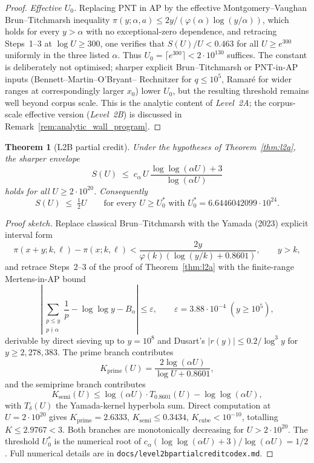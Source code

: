 \documentclass[11pt]{article}
\renewcommand{\_}{\origunderscore\allowbreak}
\newtheorem{theorem}{Theorem}[section]
\theoremstyle{definition}
\theoremstyle{remark}
\begin{document}
\begin{proof}
\emph{Effective $U_{0}$.}  Replacing PNT in AP by the effective
Montgomery--Vaughan Brun--Titchmarsh inequality
$\pi(y;\alpha,a)\le 2y/(\varphi(\alpha)\log(y/\alpha))$, which holds
for every $y>\alpha$ with no exceptional-zero dependence, and
retracing Steps~1--3 at $\log U\ge 300$, one verifies that
$S(U)/U<0.463$ for all $U\ge e^{300}$ uniformly in the three listed
$\alpha$.  Thus $U_{0}=\lceil e^{300}\rceil<2\cdot 10^{130}$ suffices.
The constant is deliberately not optimised; sharper explicit
Brun--Titchmarsh or PNT-in-AP inputs (Bennett--Martin--O'Bryant--
Rechnitzer for $q\le 10^{5}$, Ramar\'e for wider ranges at
correspondingly larger $x_{0}$) lower $U_{0}$, but the resulting
threshold remains well beyond corpus scale.  This is the analytic
content of \emph{Level~2A}; the corpus-scale effective version
(\emph{Level~2B}) is discussed in Remark~\ref{rem:analytic_wall_program}.
\end{proof}

\begin{theorem}[L2B partial credit]\label{thm:l2b_partial}
Under the hypotheses of Theorem~\ref{thm:l2a}, the sharper envelope
\[
  S(U)\;\le\;c_{\alpha}\,U\,\frac{\log\log(\alpha U)+3}{\log(\alpha U)}
\]
holds for all $U\ge 2\cdot 10^{20}$.  Consequently
\[
  S(U)\;\le\;\tfrac{1}{2}U\qquad\text{for every }U\ge U_{0}^{\ast}
  \text{ with }
  U_{0}^{\ast}=6.6446042099\cdot 10^{24}.
\]
\end{theorem}

\begin{proof}[Proof sketch]
Replace classical Brun--Titchmarsh with the Yamada (2023) explicit
interval form
\[
  \pi(x+y;k,\ell)-\pi(x;k,\ell)
  <\frac{2y}{\varphi(k)(\log(y/k)+0.8601)},
  \qquad y>k,
\]
and retrace Steps~2--3 of the proof of Theorem~\ref{thm:l2a} with the
finite-range Mertens-in-AP bound
\[
  \left|\sum_{\substack{p\le y\\p\nmid\alpha}}\frac{1}{p}
    -\log\log y-B_{\alpha}\right|\le \varepsilon,\qquad
  \varepsilon=3.88\cdot 10^{-4}\;(y\ge 10^{5}),
\]
derivable by direct sieving up to $y=10^{8}$ and Dusart's
$|r(y)|\le 0.2/\log^{3}y$ for $y\ge 2{,}278{,}383$.  The prime
branch contributes
\[
  K_{\mathrm{prime}}(U)=\frac{2\log(\alpha U)}{\log U+0.8601},
\]
and the semiprime branch contributes
\[
  K_{\mathrm{semi}}(U)\le\log(\alpha U)\cdot T_{0.8601}(U)-\log\log(\alpha U),
\]
with $T_{\delta}(U)$ the Yamada-kernel hyperbola sum.  Direct
computation at $U=2\cdot 10^{20}$ gives
$K_{\mathrm{prime}}=2.6333$, $K_{\mathrm{semi}}\le 0.3434$,
$K_{\mathrm{cube}}<10^{-10}$, totalling $K\le 2.9767<3$.  Both
branches are monotonically decreasing for $U>2\cdot 10^{20}$.  The
threshold $U_{0}^{\ast}$ is the numerical root of
$c_{\alpha}(\log\log(\alpha U)+3)/\log(\alpha U)=1/2$.
Full numerical details are in
\texttt{docs/level2b\_partial\_credit\_codex.md}.
\end{proof}
\end{document}
